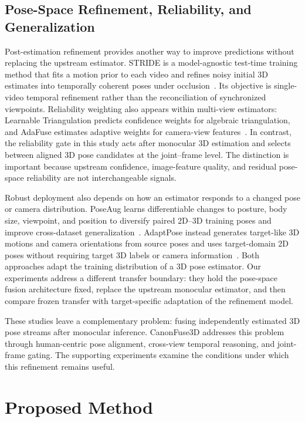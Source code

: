\documentclass[preprint,12pt]{elsarticle}
\begin{document}
\subsection{Pose-Space Refinement, Reliability, and Generalization}
Post-estimation refinement provides another way to improve predictions without replacing the upstream estimator. STRIDE is a model-agnostic test-time training method that fits a motion prior to each video and refines noisy initial 3D estimates into temporally coherent poses under occlusion~\cite{lal2025stride}. Its objective is single-video temporal refinement rather than the reconciliation of synchronized viewpoints. Reliability weighting also appears within multi-view estimators: Learnable Triangulation predicts confidence weights for algebraic triangulation, and AdaFuse estimates adaptive weights for camera-view features~\cite{iskakov2019learnable,zhang2021adafuse}. In contrast, the reliability gate in this study acts after monocular 3D estimation and selects between aligned 3D pose candidates at the joint--frame level. The distinction is important because upstream confidence, image-feature quality, and residual pose-space reliability are not interchangeable signals.

Robust deployment also depends on how an estimator responds to a changed pose or camera distribution. PoseAug learns differentiable changes to posture, body size, viewpoint, and position to diversify paired 2D--3D training poses and improve cross-dataset generalization~\cite{gong2021poseaug}. AdaptPose instead generates target-like 3D motions and camera orientations from source poses and uses target-domain 2D poses without requiring target 3D labels or camera information~\cite{gholami2022adaptpose}. Both approaches adapt the training distribution of a 3D pose estimator. Our experiments address a different transfer boundary: they hold the pose-space fusion architecture fixed, replace the upstream monocular estimator, and then compare frozen transfer with target-specific adaptation of the refinement model.

These studies leave a complementary problem: fusing independently estimated 3D pose streams after monocular inference. CanonFuse3D addresses this problem through human-centric pose alignment, cross-view temporal reasoning, and joint-frame gating. The supporting experiments examine the conditions under which this refinement remains useful.

\section{Proposed Method}
\label{sec:method}
\end{document}
